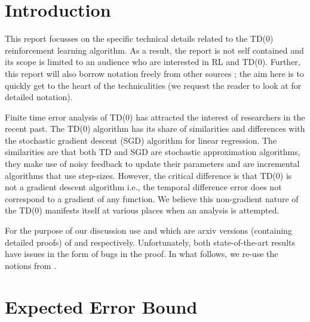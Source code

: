 \documentclass{article}
\begin{document}
\section{Introduction}
This report focusses on the specific technical details related to the TD(0) reinforcement learning algorithm. As a result, the report is not self contained and its scope is limited to an audience who are interested in RL and TD(0). Further, this report will also borrow notation freely from other sources \cite{flstda,lstdicmla}; the aim here is to quickly get to the heart of the technicalities (we request the reader to look at \cite{flstda,lstdicmla} for detailed notation).\par
Finite time error analysis of TD(0) has attracted the interest of researchers in the recent past. The TD(0) algorithm has its share of similarities and differences with the stochastic gradient descent (SGD) algorithm for linear regression. The similarities are that both TD and SGD are stochastic approximation algorithms, they make use of noisy feedback to update their parameters and are incremental algorithms that use step-sizes. However, the critical difference is that TD(0) is not a gradient descent algorithm i.e., the temporal difference error does not correspond to a gradient of any function. We believe this non-gradient nature of the TD(0) manifests itself at various places when an analysis is attempted.\par
For the purpose of our discussion use \cite{flstda} and \cite{lstdicmla} which are arxiv versions (containing detailed proofs) of \cite{flstd} and \cite{lstdicml} respectively. Unfortunately, both state-of-the-art results \cite{flstd,lstdicml} have issues in the form of bugs in the proof. In what follows, we re-use the notions from \cite{flstda,lstdicmla}. %

\section{Expected Error Bound}
\end{document}
